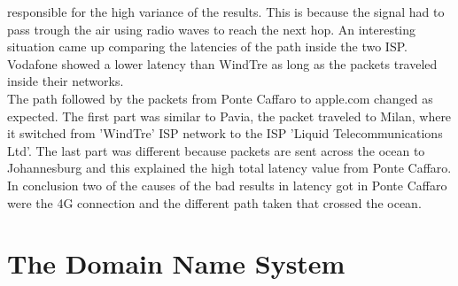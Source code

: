 \documentclass[a4paper,10pt]{article}
\begin{document}
\begin{multicols}{2}
responsible for the high variance of the results. 
This is because the signal had to pass trough the air using radio waves to reach the next hop. An interesting situation came up comparing the latencies of the path inside the
two ISP. Vodafone showed a lower latency than WindTre as long as the packets traveled inside their networks.\\
The path followed by the packets from Ponte Caffaro to apple.com changed as expected. The first part was similar to Pavia, the packet traveled to Milan, where 
it switched from 'WindTre' ISP network to the ISP 'Liquid Telecommunications Ltd'. The last part was different because packets are sent across the ocean to Johannesburg
and this explained the high total latency value from Ponte Caffaro.\\
In conclusion two of the causes of the bad results in latency got in Ponte Caffaro were the 4G connection and the different path taken that crossed the ocean.
\newpage













\section{The Domain Name System}


\end{multicols}
\end{document}

